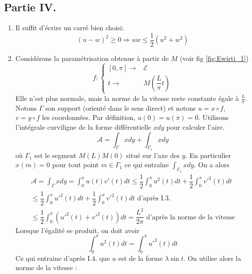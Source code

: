 \subsection*{Partie IV.}
\begin{enumerate}
 \item Il suffit d'écrire un carré bien choisi:
\begin{displaymath}
 (u-w)^2\geq 0\Rightarrow uw\leq\dfrac{1}{2}(u^2+w^2)
\end{displaymath}

 \item Considérons la paramétrisation obtenue à partir de $M$ (voir fig \ref{fig:Ewirti_1})
\begin{displaymath}
f :\left\lbrace 
\begin{aligned}
 \left[ 0 , \pi \right]  \rightarrow & \mathcal E\\
 t \rightarrow & M(\dfrac{L}{\pi}t)
\end{aligned}
\right. 
\end{displaymath}
Elle n'est plus normale, mais la norme de la vitesse reste constante égale à $\frac{L}{\pi}$.\newline
Notons $\Gamma$ son support (orienté dans le sens direct) et notons $u=x\circ f$, $v=y\circ f$ les coordonnées. Par définition, $u(0)=u(\pi)=0$. Utilisons l'intégrale curviligne de la forme différentielle $xdy$ pour calculer l'aire.
\begin{displaymath}
 \mathcal A = \int_{\Gamma}xdy + \int_{\Gamma_1}xdy
\end{displaymath}
où $\Gamma_1$ est le segment $M(L)M(0)$ situé sur l'axe des $y$. En particulier $x(m)=0$ pour tout point $m\in\Gamma_1$ ce qui entraîne $\int_{\Gamma_1}xdy$. On a alors 
\begin{multline*}
 \mathcal A = \int_{\Gamma}xdy
= \int_{0}^{\pi}u(t)v'(t)dt
\leq \dfrac{1}{2}\int_{0}^{\pi}u^2(t)dt + \dfrac{1}{2}\int_{0}^{\pi}v'^2(t)dt\\
\leq \dfrac{1}{2}\int_{0}^{\pi}u'^2(t)dt + \dfrac{1}{2}\int_{0}^{\pi}v'^2(t)dt
\text{ d'après I.3.}\\
\leq \dfrac{1}{2}\int_{0}^{\pi}\left( u'^2(t)+v'^2(t)\right) dt
=\dfrac{L^2}{2\pi} \text{ d'après la norme de la vitesse}
\end{multline*}
Lorsque l'égalité se produit, on doit avoir
\begin{displaymath}
 \int_{0}^{\pi}u^2(t)dt = \int_{0}^{\pi}u'^2(t)dt
\end{displaymath}
Ce qui entraine d'après I.4. que $u$ est de la forme $\lambda \sin t$. On utilise alors la norme de la vitesse :

\end{enumerate}
